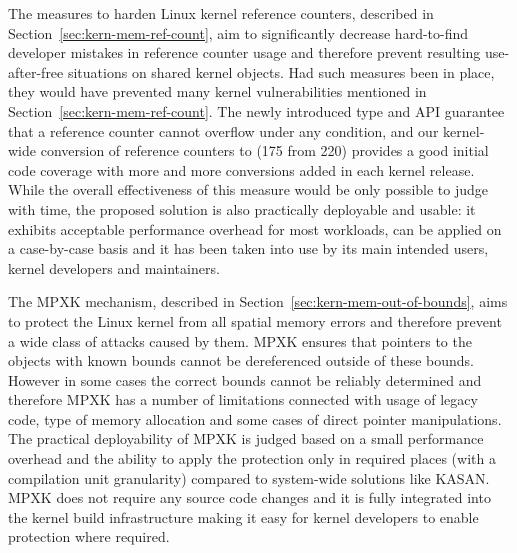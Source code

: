 The measures to harden Linux kernel reference counters, described in Section~\ref{sec:kern-mem-ref-count}, aim to significantly decrease hard-to-find developer mistakes in reference counter usage and therefore prevent resulting use-after-free situations on shared kernel objects. Had such measures been in place, they would have prevented many kernel vulnerabilities mentioned in Section~\ref{sec:kern-mem-ref-count}. The newly introduced  type and API guarantee that a reference counter cannot overflow under any condition, and our kernel-wide conversion of reference counters to  (175 from 220) provides a good initial code coverage with more and more conversions added in each kernel release. While the overall effectiveness of this measure would be only possible to judge with time, the proposed solution is also practically deployable and usable: it exhibits acceptable performance overhead for most workloads, can be applied on a case-by-case basis and it has been taken into use by its main intended users, kernel developers and maintainers. 

The MPXK mechanism, described in Section~\ref{sec:kern-mem-out-of-bounds}, aims to protect the Linux kernel from all spatial memory errors and therefore prevent a wide class of attacks caused by them. MPXK ensures that pointers to the objects with known bounds cannot be dereferenced outside of these bounds. However in some cases the correct bounds cannot be reliably determined and therefore MPXK has a number of limitations connected with usage of legacy code, type of memory allocation and some cases of direct pointer manipulations. The practical deployability of MPXK is judged based on a small performance overhead and the ability to apply the protection only in required places (with a compilation unit granularity) compared to system-wide solutions like KASAN. MPXK does not require any source code changes and it is fully integrated into the kernel build infrastructure making it easy for kernel developers to enable protection where required.  

